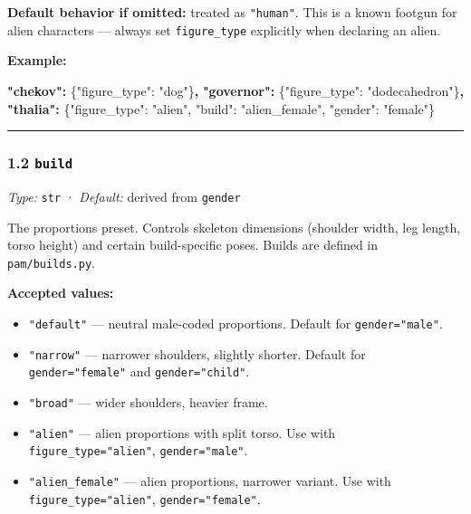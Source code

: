 \documentclass[
  11pt,
]{book}
\newenvironment{Shaded}{}{}
\newcommand{\DataTypeTok}[1]{\textcolor[rgb]{0.56,0.13,0.00}{#1}}
\newcommand{\ErrorTok}[1]{\textcolor[rgb]{1.00,0.00,0.00}{\textbf{#1}}}
\newcommand{\FunctionTok}[1]{\textcolor[rgb]{0.02,0.16,0.49}{#1}}
\newcommand{\StringTok}[1]{\textcolor[rgb]{0.25,0.44,0.63}{#1}}
\providecommand{\tightlist}{%
  \setlength{\itemsep}{0pt}\setlength{\parskip}{0pt}}
\begin{document}
\textbf{Default behavior if omitted:} treated as \texttt{"human"}. This
is a known footgun for alien characters --- always set
\texttt{figure\_type} explicitly when declaring an alien.

\textbf{Example:}

\begin{Shaded}
\begin{Highlighting}[]
\ErrorTok{"chekov":}   \FunctionTok{\{}\DataTypeTok{"figure\_type"}\FunctionTok{:} \StringTok{"dog"}\FunctionTok{\}}\ErrorTok{,}
\ErrorTok{"governor":} \FunctionTok{\{}\DataTypeTok{"figure\_type"}\FunctionTok{:} \StringTok{"dodecahedron"}\FunctionTok{\}}\ErrorTok{,}
\ErrorTok{"thalia":}   \FunctionTok{\{}\DataTypeTok{"figure\_type"}\FunctionTok{:} \StringTok{"alien"}\FunctionTok{,} \DataTypeTok{"build"}\FunctionTok{:} \StringTok{"alien\_female"}\FunctionTok{,} \DataTypeTok{"gender"}\FunctionTok{:} \StringTok{"female"}\FunctionTok{\}}
\end{Highlighting}
\end{Shaded}

\begin{center}\rule{0.5\linewidth}{0.5pt}\end{center}

\subsubsection{\texorpdfstring{1.2
\texttt{build}}{1.2 build}}\label{build}

\emph{Type:} \texttt{str} · \emph{Default:} derived from \texttt{gender}

The proportions preset. Controls skeleton dimensions (shoulder width,
leg length, torso height) and certain build-specific poses. Builds are
defined in \texttt{pam/builds.py}.

\textbf{Accepted values:}

\begin{itemize}
\tightlist
\item
  \texttt{"default"} --- neutral male-coded proportions. Default for
  \texttt{gender="male"}.
\item
  \texttt{"narrow"} --- narrower shoulders, slightly shorter. Default
  for \texttt{gender="female"} and \texttt{gender="child"}.
\item
  \texttt{"broad"} --- wider shoulders, heavier frame.
\item
  \texttt{"alien"} --- alien proportions with split torso. Use with
  \texttt{figure\_type="alien"}, \texttt{gender="male"}.
\item
  \texttt{"alien\_female"} --- alien proportions, narrower variant. Use
  with \texttt{figure\_type="alien"}, \texttt{gender="female"}.
\end{itemize}
\end{document}
